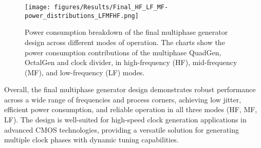 \begin{figure}[H]
  \centering
  \texttt{[image: figures/Results/Final\_HF\_LF\_MF-power\_distributions\_LFMFHF.png]}
  \caption{Power consumption breakdown of the final multiphase generator design across different modes of operation. The charts show the power consumption contributions of the multiphase QuadGen, OctalGen and clock divider, in high-frequency (HF), mid-frequency (MF), and low-frequency (LF) modes.}
  \label{fig:power_consumption}
\end{figure}

Overall, the final multiphase generator design demonstrates robust performance across a wide range of frequencies and process corners, achieving low jitter, efficient power consumption, and reliable operation in all three modes (HF, MF, LF). The design is well-suited for high-speed clock generation applications in advanced CMOS technologies, providing a versatile solution for generating multiple clock phases with dynamic tuning capabilities.
